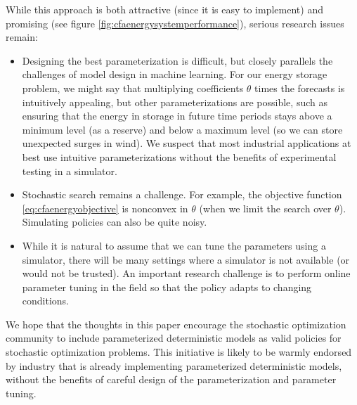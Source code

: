 \documentclass[11pt,oneside,fleqn,reqno,titlepage]{article}
\newcounter{example}
\begin{document}
While this approach is both attractive (since it is easy to implement) and promising (see figure \ref{fig:cfaenergysystemperformance}), serious research issues remain:
\begin{itemize}
  \item Designing the best parameterization is difficult, but closely parallels the challenges of model design in machine learning.  For our energy storage problem, we might say that multiplying coefficients $\theta$ times the forecasts is intuitively appealing, but other parameterizations are possible, such as ensuring that the energy in storage in future time periods stays above a minimum level (as a reserve) and below a maximum level (so we can store unexpected surges in wind).  We suspect that most industrial applications at best use intuitive parameterizations without the benefits of experimental testing in a simulator.
  \item Stochastic search remains a challenge. For example, the objective function \eqref{eq:cfaenergyobjective} is nonconvex in $\theta$ (when we limit the search over $\theta$).  Simulating policies can also be quite noisy.
  \item While it is natural to assume that we can tune the parameters using a simulator, there will be many settings where a simulator is not available (or would not be trusted).  An important research challenge is to perform online parameter tuning in the field so that the policy adapts to changing conditions.
\end{itemize}

We hope that the thoughts in this paper encourage the stochastic optimization community to include parameterized deterministic models as valid policies for stochastic optimization problems.  This initiative is likely to be warmly endorsed by industry that is already implementing parameterized deterministic models, without the benefits of careful design of the parameterization and parameter tuning.


\end{document}
